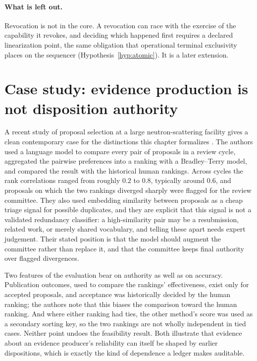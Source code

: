 \documentclass[11pt,openany]{book}
\theoremstyle{remark}
\begin{document}
\paragraph{What is left out.} Revocation is not in the core. A
revocation can race with the exercise of the capability it revokes, and
deciding which happened first requires a declared linearization point,
the same obligation that operational terminal exclusivity places on the
sequencer (Hypothesis~\ref{hyp:atomic}). It is a later extension.

\section[Case study: evidence is not authority]{Case study: evidence production is not disposition authority}

A recent study of proposal selection at a large neutron-scattering
facility gives a clean contemporary case for the distinctions this chapter
formalizes \cite{ding}. The authors used a language model to compare every
pair of proposals in a review cycle, aggregated the pairwise preferences
into a ranking with a Bradley--Terry model, and compared the result with
the historical human rankings. Across cycles the rank correlations ranged
from roughly $0.2$ to $0.8$, typically around $0.6$, and proposals on
which the two rankings diverged sharply were flagged for the review
committee. They also used embedding similarity between proposals as a
cheap triage signal for possible duplicates, and they are explicit that
this signal is not a validated redundancy classifier: a high-similarity
pair may be a resubmission, related work, or merely shared vocabulary, and
telling these apart needs expert judgement. Their stated position is that
the model should augment the committee rather than replace it, and that
the committee keeps final authority over flagged divergences.

Two features of the evaluation bear on authority as well as on accuracy.
Publication outcomes, used to compare the rankings' effectiveness, exist
only for accepted proposals, and acceptance was historically decided by
the human ranking; the authors note that this biases the comparison
toward the human ranking. And where either ranking had ties, the other
method's score was used as a secondary sorting key, so the two rankings
are not wholly independent in tied cases. Neither point undoes the
feasibility result. Both illustrate that evidence about an evidence
producer's reliability can itself be shaped by earlier dispositions, which
is exactly the kind of dependence a ledger makes auditable.
\end{document}

